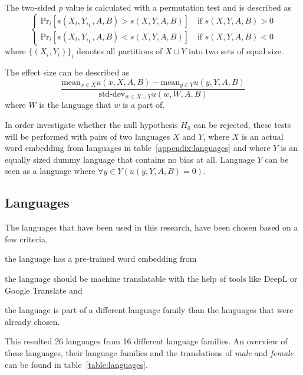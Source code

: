 The two-sided \emph{p} value is calculated with a permutation test and is described as
$$
\begin{cases}
    \text{Pr}_i[s(X_i, Y,_i, A, B) > s(X,Y,A,B)] \quad \text{if } s(X,Y,A,B) > 0 \\
    \text{Pr}_i[s(X_i, Y,_i, A, B) < s(X,Y,A,B)] \quad \text{if } s(X,Y,A,B) < 0
\end{cases}
$$
where $\{(X_i, Y_i)\}_i$ denotes all partitions of $X \cup Y$ into two sets of equal 
size.

The effect size can be described as
$$
\frac{
    \text{mean}_{x \in X} u(x, X, A, B) - \text{mean}_{y \in Y} u(y, Y, A, B)
}{
    \text{std-dev}_{w \in X \cup Y} u(w,W,A,B)
}
$$
where $W$ is the language that $w$ is a part of.

In order investigate whether the null hypothesis $H_0$ can be rejected, these tests will
be performed with pairs of two languages $X$ and $Y$, where $X$ is an actual word embedding
from languages in table~\ref{appendix:languages} and where $Y$ is an equally sized dummy
language that
contains no bias at all. Language $Y$ can be seen as a language where
$\forall y \in Y(u(y,Y,A,B) = 0)$.

\subsection{Languages}
The languages that have been used in this research, have been chosen based on a
few criteria,
\begin{seriate}
    \item the language has a pre-trained word embedding from \textcite{grave2018learning}
    \item the language should be machine translatable with the help of tools like DeepL or
    Google Translate and
    \item the language is part of a different language family than the languages that
    were already chosen.
\end{seriate}
This resulted 26 languages from 16 different language families. An overview of these languages, their language families and the translations of \textit{male} and \textit{female}
can be found in table~\ref{table:languages}.

